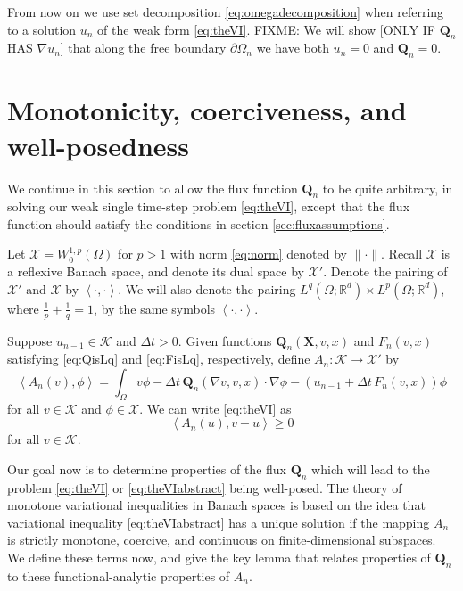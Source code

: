 \documentclass[final,leqno,onefignum,onetabnum]{siamltex1213bueler}
\newcommand\bQ{\mathbf{Q}}
\newcommand\bX{\mathbf{X}}
\renewcommand{\grad}{\nabla}
\newcommand{\ip}[2]{\ensuremath{\left<#1,#2\right>}}
\newcommand\RR{\mathbb{R}}
\begin{document}
\medskip
From now on we use set decomposition \eqref{eq:omegadecomposition} when referring to a solution $u_n$ of the weak form \eqref{eq:theVI}.  FIXME:  We will show [ONLY IF $\bQ_n$ HAS $\grad u_n$] that along the free boundary $\partial\Omega_n$ we have both $u_n=0$ and $\bQ_n = 0$.


\section{Monotonicity, coerciveness, and well-posedness} \label{sec:mono}

We continue in this section to allow the flux function $\bQ_n$ to be quite arbitrary, in solving our weak single time-step problem \eqref{eq:theVI}, except that the flux function should satisfy the conditions in section \ref{sec:fluxassumptions}.

Let $\mathcal{X} = W_0^{1,p}(\Omega)$ for $p > 1$ with norm \eqref{eq:norm} denoted by $\|\cdot\|$.  Recall $\mathcal{X}$ is a reflexive Banach space, and denote its dual space by $\mathcal{X}'$.  Denote the pairing of $\mathcal{X}'$ and $\mathcal{X}$ by $\ip{\cdot}{\cdot}$.  We will also denote the pairing $L^q(\Omega;\RR^d) \times L^p(\Omega;\RR^d)$, where $\frac{1}{p}+\frac{1}{q}=1$, by the same symbols $\ip{\cdot}{\cdot}$.

\medskip
\newcommand{\An}{A_{n}}
\begin{definition}  Suppose $u_{n-1}\in\mathcal{K}$ and $\Delta t>0$.  Given functions $\bQ_n(\bX,v,x)$ and $F_n(v,x)$ satisfying \eqref{eq:QisLq} and \eqref{eq:FisLq}, respectively, define $\An:\mathcal{K} \to \mathcal{X}'$ by
\begin{equation}
  \ip{\An(v)}{\phi} = \int_\Omega v \phi - \Delta t\, \bQ_n(\grad v,v,x) \cdot \grad\phi - \left(u_{n-1} + \Delta t\, F_n(v,x) \right) \phi \label{eq:defineAn}
\end{equation}
for all $v \in \mathcal{K}$ and $\phi\in\mathcal{X}$.  We can write \eqref{eq:theVI} as
\begin{equation}
  \ip{\An(u)}{v-u} \ge 0 \label{eq:theVIabstract}
\end{equation}
for all $v \in \mathcal{K}$.
\end{definition}

Our goal now is to determine properties of the flux $\bQ_n$ which will lead to the problem \eqref{eq:theVI} or \eqref{eq:theVIabstract} being well-posed.  The theory of monotone variational inequalities in Banach spaces \cite[chapter III]{KinderlehrerStampacchia} is based on the idea that variational inequality \eqref{eq:theVIabstract} has a unique solution if the mapping $\An$ is strictly monotone, coercive, and continuous on finite-dimensional subspaces.  We define these terms now, and give the key lemma that relates properties of $\bQ_n$ to these functional-analytic properties of $\An$.
\end{document}

